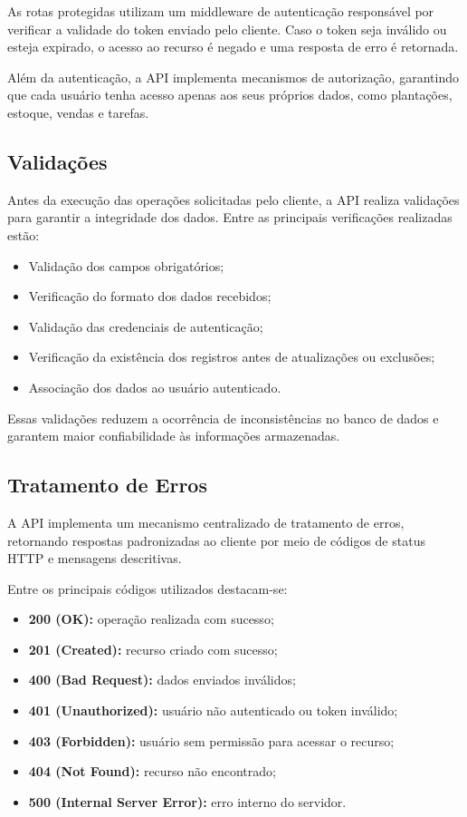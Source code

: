 \documentclass[12pt]{article}
\begin{document}
As rotas protegidas utilizam um middleware de autenticação responsável por verificar a validade do token enviado pelo cliente. Caso o token seja inválido ou esteja expirado, o acesso ao recurso é negado e uma resposta de erro é retornada.

Além da autenticação, a API implementa mecanismos de autorização, garantindo que cada usuário tenha acesso apenas aos seus próprios dados, como plantações, estoque, vendas e tarefas.

\subsection{Validações}

Antes da execução das operações solicitadas pelo cliente, a API realiza validações para garantir a integridade dos dados. Entre as principais verificações realizadas estão:

\begin{itemize}
    \item Validação dos campos obrigatórios;
    \item Verificação do formato dos dados recebidos;
    \item Validação das credenciais de autenticação;
    \item Verificação da existência dos registros antes de atualizações ou exclusões;
    \item Associação dos dados ao usuário autenticado.
\end{itemize}

Essas validações reduzem a ocorrência de inconsistências no banco de dados e garantem maior confiabilidade às informações armazenadas.

\subsection{Tratamento de Erros}

A API implementa um mecanismo centralizado de tratamento de erros, retornando respostas padronizadas ao cliente por meio de códigos de status HTTP e mensagens descritivas.

Entre os principais códigos utilizados destacam-se:

\begin{itemize}
    \item \textbf{200 (OK):} operação realizada com sucesso;
    \item \textbf{201 (Created):} recurso criado com sucesso;
    \item \textbf{400 (Bad Request):} dados enviados inválidos;
    \item \textbf{401 (Unauthorized):} usuário não autenticado ou token inválido;
    \item \textbf{403 (Forbidden):} usuário sem permissão para acessar o recurso;
    \item \textbf{404 (Not Found):} recurso não encontrado;
    \item \textbf{500 (Internal Server Error):} erro interno do servidor.
\end{itemize}
\end{document}
